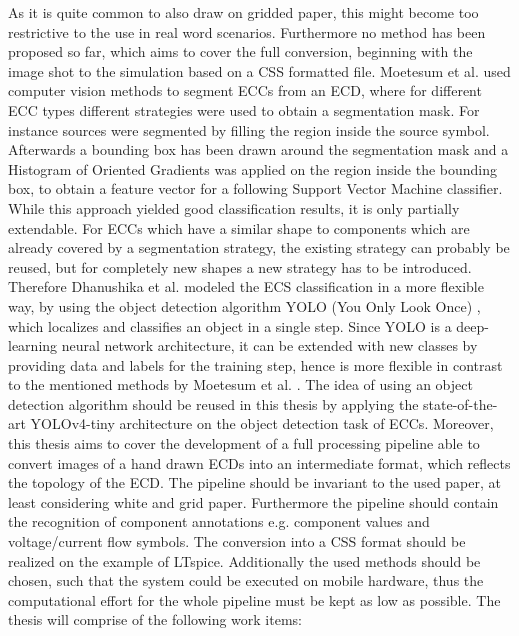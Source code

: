\documentclass{article} %
\begin{document}
As it is quite common to also draw on gridded paper, this might become too restrictive to the use in real word scenarios.
Furthermore no method has been proposed so far, which aims to cover the full conversion, beginning with the image shot to the simulation based on a CSS formatted file.
Moetesum et al. \cite{seghogsvm} used computer vision methods to segment ECCs from an ECD, where for different ECC types different strategies were used to obtain a segmentation mask.
For instance sources were segmented by filling the region inside the source symbol.
Afterwards a bounding box has been drawn around the segmentation mask and a Histogram of Oriented Gradients was applied on the region inside the bounding box, to obtain a feature vector for a following Support Vector Machine classifier.
While this approach yielded good classification results, it is only partially extendable.
For ECCs which have a similar shape to components which are already covered by a segmentation strategy, the existing strategy can probably be reused, but for completely new shapes a new strategy has to be introduced.
Therefore Dhanushika et al. \cite{yolobool} modeled the ECS classification in a more flexible way, by using the object detection algorithm YOLO (You Only Look Once) \cite{yolov1}, which localizes and classifies an object in a single step.
Since YOLO is a deep-learning neural network architecture, it can be extended with new classes by providing data and labels for the training step, hence is more flexible in contrast to the mentioned methods by Moetesum et al. \cite{seghogsvm}.
The idea of using an object detection algorithm should be reused in this thesis by applying the state-of-the-art YOLOv4-tiny architecture \cite{yolov4} on the object detection task of ECCs.
\lf
Moreover, this thesis aims to cover the development of a full processing pipeline able to convert images of a hand drawn ECDs into an intermediate format, which reflects the topology of the ECD.
The pipeline should be invariant to the used paper, at least considering white and grid paper.
Furthermore the pipeline should contain the recognition of component annotations e.g. component values and voltage/current flow symbols.
The conversion into a CSS format should be realized on the example of LTspice.
Additionally the used methods should be chosen, such that the system could be executed on mobile hardware, thus the computational effort for the whole pipeline must be kept as low as possible.
\lf
The thesis will comprise of the following work items:
\end{document}
